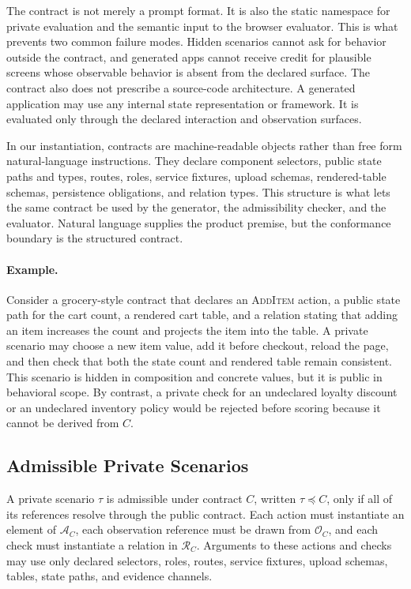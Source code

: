 The contract is not merely a prompt format. It is also the static namespace for
private evaluation and the semantic input to the browser evaluator. This is
what prevents two common failure modes. Hidden scenarios cannot ask for
behavior outside the contract, and generated apps cannot receive credit for
plausible screens whose observable behavior is absent from the declared
surface. The contract also does not prescribe a source-code architecture. A
generated application may use any internal state representation or framework.
It is evaluated only through the declared interaction and observation surfaces.

In our instantiation, contracts are machine-readable objects rather than free
form natural-language instructions. They declare component selectors, public
state paths and types, routes, roles, service fixtures, upload schemas,
rendered-table schemas, persistence obligations, and relation types. This
structure is what lets the same contract be used by the generator, the
admissibility checker, and the evaluator. Natural language supplies the product
premise, but the conformance boundary is the structured contract.

\paragraph{Example.}
Consider a grocery-style contract that declares an \textsc{AddItem} action, a
public state path for the cart count, a rendered cart table, and a relation
stating that adding an item increases the count and projects the item into the
table. A private scenario may choose a new item value, add it before checkout,
reload the page, and then check that both the state count and rendered table
remain consistent. This scenario is hidden in composition and concrete values,
but it is public in behavioral scope. By contrast, a private check for an
undeclared loyalty discount or an undeclared inventory policy would be rejected
before scoring because it cannot be derived from \(C\).

\subsection{Admissible Private Scenarios}
\label{sec:admissibility}

A private scenario \(\tau\) is admissible under contract \(C\), written
\(\tau \preceq C\), only if all of its references resolve through the public
contract. Each action must instantiate an element of \(\mathcal{A}_C\), each
observation reference must be drawn from \(\mathcal{O}_C\), and each check must
instantiate a relation in \(\mathcal{R}_C\). Arguments to these actions and
checks may use only declared selectors, roles, routes, service fixtures, upload
schemas, tables, state paths, and evidence channels.

